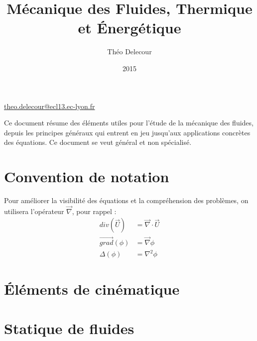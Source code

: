 \documentclass[10pt,a4paper,twocolumn,fleqn]{article}
\title{Mécanique des Fluides, Thermique et Énergétique}
\author{Théo Delecour}
\date{2015}
\begin{document}
\makeatletter

\begin{center}
 \LARGE \@title
 
 \Large \@author
 
 \large \href{mailto:theo.delecour@ecl13.ec-lyon.net}{theo.delecour@ecl13.ec-lyon.fr}
\end{center}

\makeatother

Ce document résume des éléments utiles pour l'étude de la mécanique des fluides, depuis les principes généraux qui entrent en jeu jusqu'aux applications concrètes des équations. Ce document se veut général et non spécialisé.



\section*{Convention de notation}
Pour améliorer la visibilité des équations et la compréhension des problèmes, on utilisera l'opérateur $\vec{\nabla}$, pour rappel :
%
\begin{equation*}
\begin{aligned}
div (\vec{U}) &= \vec{\nabla} \cdot \vec{U} \\
\vec{grad} (\phi) &= \vec{\nabla} \phi \\
\Delta (\phi) &= \nabla^2 \phi
\end{aligned}
\end{equation*}



\section{Éléments de cinématique}


\section{Statique de fluides}\label{sec:statique} %


\end{document}
